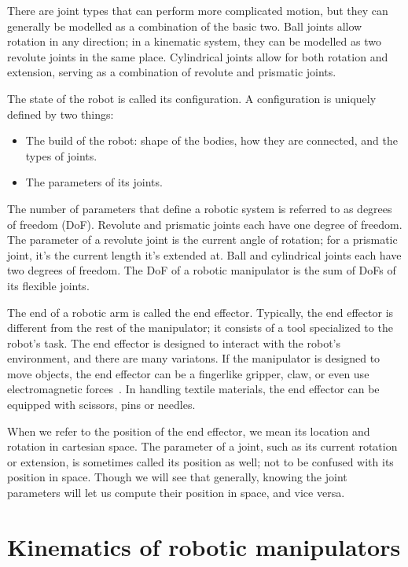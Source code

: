 There are joint types that can perform more complicated motion, but they can generally be modelled as a combination of the basic two. Ball joints allow rotation in any direction; in a kinematic system, they can be modelled as two revolute joints in the same place. Cylindrical joints allow for both rotation and extension, serving as a combination of revolute and prismatic joints.

The state of the robot is called its configuration. A configuration is uniquely defined by two things:
\begin{itemize}
  \item The build of the robot: shape of the bodies, how they are connected, and the types of joints.
  \item The parameters of its joints.
\end{itemize}

The number of parameters that define a robotic system is referred to as degrees of freedom (DoF). Revolute and prismatic joints each have one degree of freedom. The parameter of a revolute joint is the current angle of rotation; for a prismatic joint, it's the current length it's extended at. Ball and cylindrical joints each have two degrees of freedom. The DoF of a robotic manipulator is the sum of DoFs of its flexible joints.

The end of a robotic arm is called the end effector. Typically, the end effector is different from the rest of the manipulator; it consists of a tool specialized to the robot's task. The end effector is designed to interact with the robot's environment, and there are many variatons. If the manipulator is designed to move objects, the end effector can be a fingerlike gripper, claw, or even use electromagnetic forces~\cite{grippers}. In handling textile materials, the end effector can be equipped with scissors, pins or needles.

When we refer to the position of the end effector, we mean its location and rotation in cartesian space. The parameter of a joint, such as its current rotation or extension, is sometimes called its position as well; not to be confused with its position in space. Though we will see that generally, knowing the joint parameters will let us compute their position in space, and vice versa.

\section{Kinematics of robotic manipulators}

